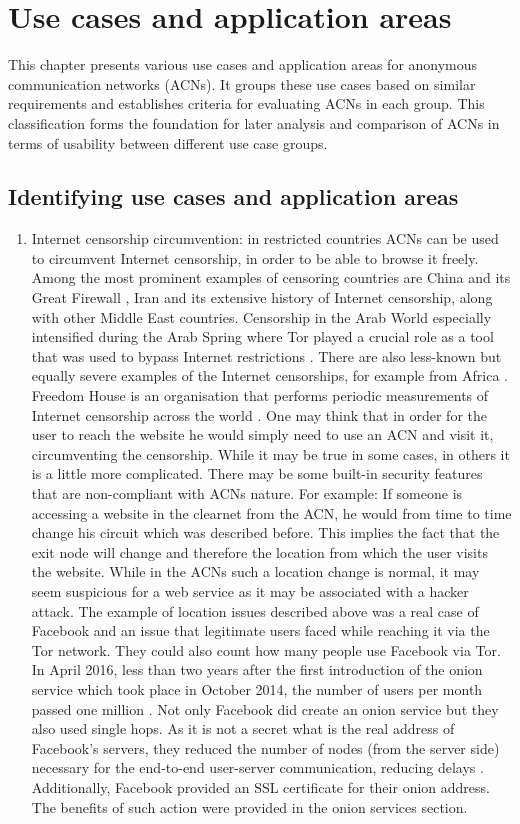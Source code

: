 \chapter{Use cases and application areas}

This chapter presents various use cases and application areas for anonymous communication networks (ACNs). It groups these use cases based on similar requirements and establishes criteria for evaluating ACNs in each group. This classification forms the foundation for later analysis and comparison of ACNs in terms of usability between different use case groups.

\section{Identifying use cases and application areas}
\begin{enumerate}
    \item Internet censorship circumvention: in restricted countries ACNs can be used to circumvent Internet censorship, in order to be able to browse it freely. Among the most prominent examples of censoring countries are China and its Great Firewall \cite{gfw-china}, Iran and its extensive history of Internet censorship, along with other Middle East countries. Censorship in the Arab World especially intensified during the Arab Spring where Tor played a crucial role as a tool that was used to bypass Internet restrictions \cite{arab-spring}. There are also less-known but equally severe examples of the Internet censorships, for example from Africa \cite{africa}. Freedom House is an organisation that performs periodic measurements of Internet censorship across the world \cite{freedomhouse_internet}.
    One may think that in order for the user to reach the website he would simply need to use an ACN and visit it, circumventing the censorship. While it may be true in some cases, in others it is a little more complicated. There may be some built-in security features that are non-compliant with ACNs nature. For example: If someone is accessing a website in the clearnet from the ACN, he would from time to time change his circuit which was described before. This implies the fact that the exit node will change and therefore the location from which the user visits the website. While in the ACNs such a location change is normal, it may seem suspicious for a web service as it may be associated with a hacker attack.
    The example of location issues described above was a real case of Facebook and an issue that legitimate users faced while reaching it via the Tor network. They could also count how many people use Facebook via Tor. In April 2016, less than two years after the first introduction of the onion service which took place in October 2014, the number of users per month passed one million \cite{facebook-tor-note}. Not only Facebook did create an onion service but they also used single hops. As it is not a secret what is the real address of Facebook's servers, they reduced the number of nodes (from the server side) necessary for the end-to-end user-server communication, reducing delays \cite{facebook-tor}. Additionally, Facebook provided an SSL certificate for their onion address. The benefits of such action were provided in the onion services section.

\end{enumerate}

